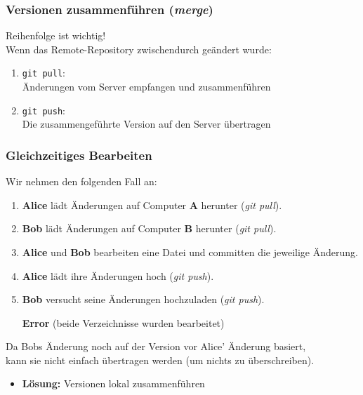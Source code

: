 \documentclass[accentcolor=tud8b,colorbacktitle,inverttitle,landscape,german,presentation,t]{tudbeamer}
\newcommand{\diffn}[1]{\textcolor{darkgreen}{#1}}
\begin{document}
\begin{frame}
			\end{frame}
		
			\begin{frame}
				\frametitle{Versionen zusammenführen (\textit{merge})}
				Reihenfolge ist wichtig!\\ Wenn das Remote-Repository zwischendurch geändert wurde:
				\begin{enumerate}
					\item \texttt{git pull}:\\Änderungen vom Server empfangen und zusammenführen
					\item \texttt{git push}:\\Die zusammengeführte Version auf den Server übertragen
				\end{enumerate}
			\end{frame}
	
			\begin{frame}
				\frametitle{Gleichzeitiges Bearbeiten}
				Wir nehmen den folgenden Fall an:
				\begin{enumerate}
					\item \textbf{Alice} lädt Änderungen auf Computer \textbf{A} herunter (\textit{git pull}).
					\pause
					\item \textbf{Bob} lädt Änderungen auf Computer \textbf{B} herunter (\textit{git pull}).
					\pause
					\item \textbf{Alice} und \textbf{Bob} bearbeiten eine Datei und committen die jeweilige Änderung.
					\pause
					\item \textbf{Alice} lädt ihre Änderungen hoch (\textit{git push}).
					\pause
					\item \textbf{Bob } versucht seine Änderungen hochzuladen (\textit{git push}).
					\pause
					\item [\textbf{Error}] (beide Verzeichnisse wurden bearbeitet)
				\end{enumerate}
				
				Da Bobs Änderung noch auf der Version vor Alice' Änderung basiert,\\
				kann sie nicht einfach übertragen werden (um nichts zu überschreiben).\\
				\begin{itemize}
					\item \textbf{Lösung:} Versionen lokal zusammenführen
				\end{itemize}
			\end{frame}
		
\end{document}
